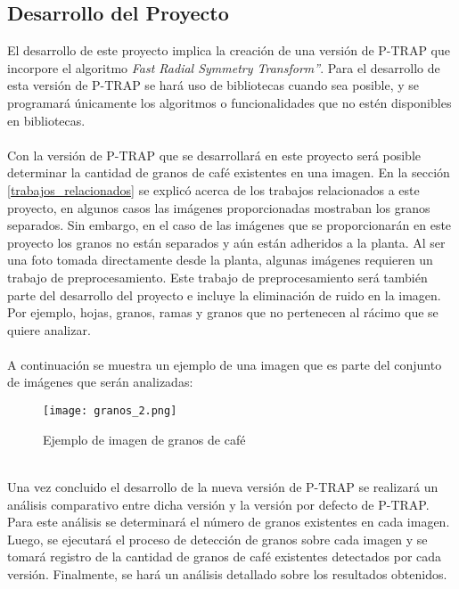 \subsection{Desarrollo del Proyecto}
El desarrollo de este proyecto implica la creaci\'on de una versi\'on de P-TRAP\cite{ptrap} que incorpore el algoritmo \textit{Fast Radial Symmetry Transform”}\cite{loyzelinsky}. Para el desarrollo de esta versi\'on de P-TRAP\cite{ptrap} se har\'a uso de bibliotecas cuando sea posible, y se programar\'a \'unicamente los algoritmos o funcionalidades que no est\'en disponibles en bibliotecas.
\\\\
Con la versi\'on de P-TRAP\cite{ptrap} que se desarrollar\'a en este proyecto ser\'a posible determinar la cantidad de granos de caf\'e existentes en una imagen. En la secci\'on \ref{trabajos_relacionados} se explic\'o acerca de los trabajos relacionados a este proyecto, en algunos casos las im\'agenes proporcionadas mostraban los granos separados. Sin embargo, en el caso de las im\'agenes que se proporcionar\'an en este proyecto los granos no est\'an separados y a\'un est\'an adheridos a la planta. Al ser una foto tomada directamente desde la planta, algunas im\'agenes requieren un trabajo de preprocesamiento. Este trabajo de preprocesamiento ser\'a tambi\'en parte del desarrollo del proyecto e incluye la eliminaci\'on de ruido en la imagen. Por ejemplo, hojas, granos, ramas y granos que no pertenecen al r\'acimo que se quiere analizar. 
\\\\
A continuaci\'on se muestra un ejemplo de una imagen que es parte del conjunto de im\'agenes que ser\'an analizadas:
\begin{figure}[!ht]
  \centering
    \texttt{[image: granos\_2.png]}
  \caption{Ejemplo de imagen de granos de caf\'e}
  \label{granos_desarrollo}
\end{figure}
\\Una vez concluido el desarrollo de la nueva versi\'on de P-TRAP\cite{ptrap} se realizar\'a un an\'alisis comparativo entre dicha versi\'on y la versi\'on por defecto de P-TRAP\cite{ptrap}. Para este an\'alisis se determinar\'a el n\'umero de granos existentes en cada imagen. Luego, se ejecutar\'a el proceso de detecci\'on de granos sobre cada imagen y se tomar\'a registro de la cantidad de granos de caf\'e existentes detectados por cada versi\'on. Finalmente, se har\'a un an\'alisis detallado sobre los resultados obtenidos.